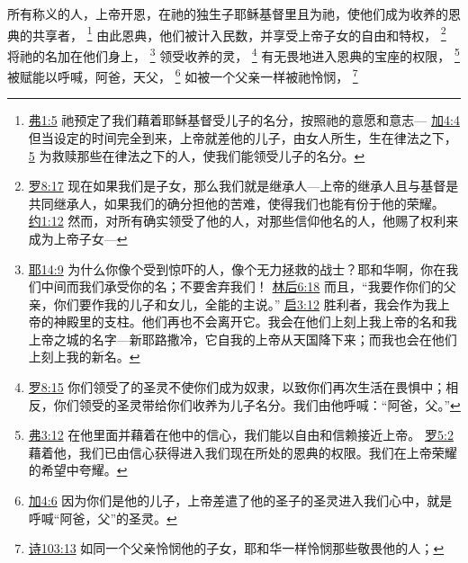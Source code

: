 \documentclass[12pt, a4paper, oneside]{ctexart}
\begin{document}
所有称义的人，上帝开恩，在祂的独生子耶稣基督里且为祂，使他们成为收养的恩典的共享者，
	\footnote {
		\href{https://biblehub.com/ephesians/1-5.htm}{弗1:5} 祂预定了我们藉着耶稣基督受儿子的名分，按照祂的意愿和意志---
		\href{https://biblehub.com/galatians/4-4.htm}{加4:4} 但当设定的时间完全到来，上帝就差他的儿子，由女人所生，生在律法之下，
		\href{https://biblehub.com/galatians/4-5.htm}{5} 为救赎那些在律法之下的人，使我们能领受儿子的名分。
	}
	由此恩典，他们被计入民数，并享受上帝子女的自由和特权，
	\footnote {
		\href{https://biblehub.com/romans/8-17.htm}{罗8:17} 现在如果我们是子女，那么我们就是继承人---上帝的继承人且与基督是共同继承人，如果我们的确分担他的苦难，使得我们也能有份于他的荣耀。
		\href{https://biblehub.com/john/1-12.htm}{约1:12} 然而，对所有确实领受了他的人，对那些信仰他名的人，他赐了权利来成为上帝子女---
	}
	将祂的名加在他们身上，
	\footnote {
		\href{https://biblehub.com/jeremiah/14-9.htm}{耶14:9} 为什么你像个受到惊吓的人，像个无力拯救的战士？耶和华啊，你在我们中间而我们承受你的名；不要舍弃我们！
		\href{https://biblehub.com/2_corinthians/6-18.htm}{林后6:18} 而且，“我要作你们的父亲，你们要作我的儿子和女儿，全能的主说。”
		\href{https://biblehub.com/revelation/3-12.htm}{启3:12} 胜利者，我会作为我上帝的神殿里的支柱。他们再也不会离开它。我会在他们上刻上我上帝的名和我上帝之城的名字---新耶路撒冷，它自我的上帝从天国降下来；而我也会在他们上刻上我的新名。
	}
	领受收养的灵，
	\footnote {
		\href{https://biblehub.com/romans/8-15.htm}{罗8:15} 你们领受了的圣灵不使你们成为奴隶，以致你们再次生活在畏惧中；相反，你们领受的圣灵带给你们收养为儿子名分。我们由他呼喊：“阿爸，父。”
	}
	有无畏地进入恩典的宝座的权限，
	\footnote {
		\href{https://biblehub.com/ephesians/3-12.htm}{弗3:12} 在他里面并藉着在他中的信心，我们能以自由和信赖接近上帝。
		\href{https://biblehub.com/romans/5-2.htm}{罗5:2} 藉着他，我们已由信心获得进入我们现在所处的恩典的权限。我们在上帝荣耀的希望中夸耀。
	}
	被赋能以呼喊，阿爸，天父，
	\footnote {
		\href{https://biblehub.com/galatians/4-6.htm}{加4:6} 因为你们是他的儿子，上帝差遣了他的圣子的圣灵进入我们心中，就是呼喊“阿爸，父”的圣灵。
	}
	如被一个父亲一样被祂怜悯，
	\footnote {
		\href{https://biblehub.com/psalms/103-13.htm}{诗103:13} 如同一个父亲怜悯他的子女，耶和华一样怜悯那些敬畏他的人；
	}
\end{document}
